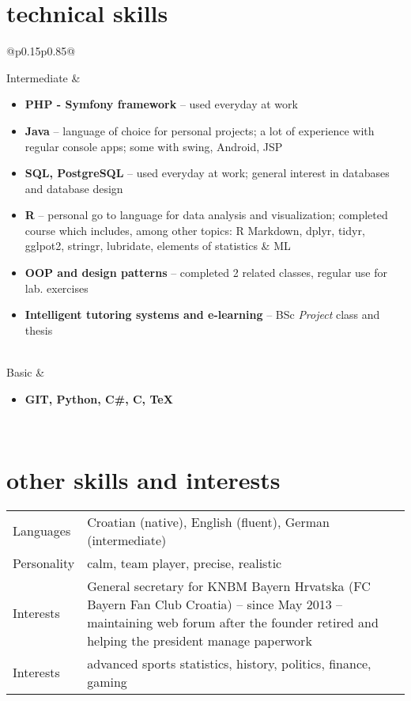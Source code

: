 \documentclass[a4paper]{article}
\makeatletter
\newlength{\tablewidth}
\newenvironment{skills}{%
\setlength{\tablewidth}{\linewidth}
\addtolength{\tablewidth}{-2\tabcolsep}
\begin{tabular}{@{}p{0.15\tablewidth}p{0.85\tablewidth}@{}}
}{%
\end{tabular}
}
\makeatother
\begin{document}
\section{technical skills}
\begin{skills}
    Intermediate &
    \begin{itemize}
        \item \textbf{PHP - Symfony framework} -- used everyday at work    
        \item \textbf{Java} -- language of choice for personal projects; a lot of experience with regular console apps; some with swing, Android, JSP
        \item \textbf{SQL, PostgreSQL} -- used everyday at work; general interest in databases and database design
        \item \textbf{R} -- personal go to language for data analysis and visualization; completed course which includes, among other topics:
        \newline
        R Markdown, dplyr, tidyr, gglpot2, stringr, lubridate, elements of statistics \& ML
        \item \textbf{OOP and design patterns} -- completed 2 related classes, regular use for lab. exercises
        \item \textbf{Intelligent tutoring systems and e-learning} -- BSc \textit{Project} class and thesis
    \end{itemize}\\
    Basic &
    \begin{itemize}
        \item \textbf{GIT, Python, C\#, C, TeX}
    \end{itemize} \\
\end{skills}


\section{other skills and interests}
\begin{skills}
	Languages & Croatian (native), English (fluent), German (intermediate) \\
	Personality & calm, team player, precise, realistic \\
	Interests & General secretary for KNBM Bayern Hrvatska (FC Bayern Fan Club Croatia) -- since May 2013 -- maintaining web forum after the founder retired and helping the president manage paperwork \\
	Interests & advanced sports statistics, history, politics, finance, gaming \\
\end{skills}
\end{document}
